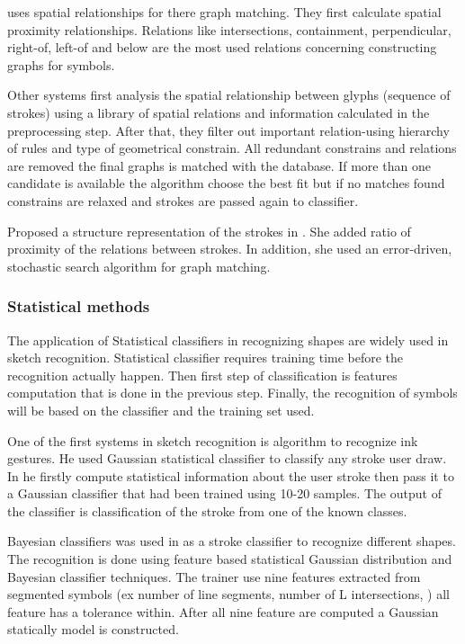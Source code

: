 \cite{physicalmeaning6} uses spatial relationships for there graph matching. They first calculate spatial proximity relationships. Relations like intersections, containment, perpendicular, right-of, left-of and below are the most used relations concerning constructing graphs for symbols.  

Other systems  first analysis the spatial relationship between glyphs (sequence of strokes) using a library of spatial relations and information calculated in the preprocessing step.  After that, they filter out important relation-using hierarchy of rules and type of geometrical constrain. All redundant constrains and relations are removed the final graphs is matched with the database. If more than one candidate is available the algorithm choose the best fit but if no matches found constrains are relaxed and strokes are passed again to classifier.

 Proposed a structure representation of the strokes in \cite{sketchunderstanding1,HierarchicalParsing7} . She added ratio of proximity of the relations between strokes. In addition, she used an error-driven, stochastic search algorithm for graph matching. 




\subsubsection{Statistical methods}
\label{sec:Statisticalmethods}

The application of Statistical classifiers in recognizing shapes are widely used in sketch recognition. Statistical classifier requires training time before the recognition actually happen. Then first step of classification is features computation that is done in the previous step. Finally, the recognition of symbols will be based on the classifier and the training set used.  

One of the first systems in sketch recognition is \citep{gestureexample12,aideddesgin22} algorithm to recognize ink gestures. He used Gaussian statistical classifier to classify any stroke user draw.  In \cite {gestureexample12}  he firstly compute statistical information about the user stroke then pass it to a Gaussian classifier that had been trained using 10-20 samples. The output of the classifier is classification of the stroke from one of the known classes.

Bayesian classifiers was used in \cite{Vibratory8} as a stroke classifier to recognize different shapes. The recognition is done using feature based statistical Gaussian distribution and Bayesian classifier techniques. The trainer use nine features extracted from segmented symbols (ex number of line segments, number of L intersections, ) all feature has a tolerance within. After all nine feature are computed a Gaussian statically model is constructed.
 
